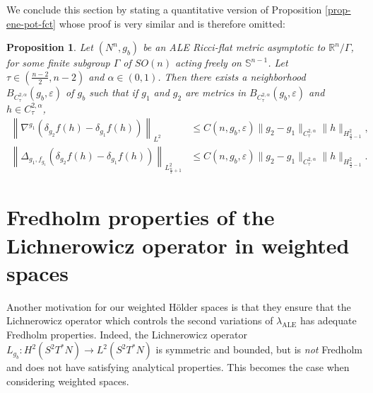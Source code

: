 \documentclass[a4paper,11pt,reqno]{amsart}
\newtheorem{prop}[defn]{Proposition}
\def\RR{\mathbb{R}}
\numberwithin{equation}{section}
\begin{document}
	We conclude this section by stating a quantitative version of Proposition \ref{prop-ene-pot-fct} whose proof is very similar and is therefore omitted:
	\begin{prop}\label{prop-ene-pot-fct-bis}
		Let $(N^n,g_b)$ be an ALE Ricci-flat metric asymptotic to $\RR^n\slash\Gamma$, for some finite subgroup $\Gamma$ of $SO(n)$ acting freely on $\mathbb{S}^{n-1}$. Let $\tau\in\left(\frac{n-2}{2},n-2\right)$ and $\alpha\in (0,1)$. Then there exists a neighborhood $B_{C^{2,\alpha}_{\tau}}(g_b,\varepsilon)$ of $g_b$ such that if $g_1$ and $g_2$ are metrics in $B_{C^{2,\alpha}_{\tau}}(g_b,\varepsilon)$ and $h\in C^{2,\alpha}_{\tau}$,
		\begin{equation}
		\begin{split}
		\left\|\nabla^{g_1}\left(\delta_{g_2}f(h)-\delta_{g_1}f(h)\right)\right\|_{L^2}&\leq C(n,g_b,\varepsilon)\|g_2-g_1\|_{C^{2,\alpha}_{\tau}}\|h\|_{H^2_{\frac{n}{2}-1}},\\
		\left\|\Delta_{g_1,f_{g_1}}\left(\delta_{g_2}f(h)-\delta_{g_1}f(h)\right)\right\|_{L^2_{\frac{n}{2}+1}}&\leq C(n,g_b,\varepsilon)\|g_2-g_1\|_{C^{2,\alpha}_{\tau}}\|h\|_{H^2_{\frac{n}{2}-1}}.
		\end{split}
		\end{equation}
			\end{prop}

	
	\section{Fredholm properties of the Lichnerowicz operator in weighted spaces}\label{fred-sec-prop}
	
	Another motivation for our weighted H\"older spaces is that they ensure that the Lichnerowicz operator which controls the second variations of $\lambda_{\operatorname{ALE}}$ has adequate Fredholm properties. Indeed, the Lichnerowicz operator $L_{g_b}:H^{2}(S^2T^*N)\rightarrow L^2(S^2T^*N)$ is symmetric and bounded, but is \emph{not} Fredholm and does not have satisfying analytical properties. This becomes the case when considering weighted spaces.
	
	
	
\end{document}

